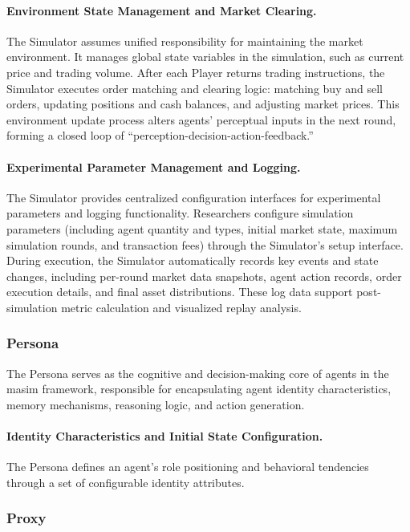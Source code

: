 \documentclass{article}
\begin{document}
\paragraph{Environment State Management and Market Clearing.}
The Simulator assumes unified responsibility for maintaining the market environment. It manages global state variables in the simulation, such as current price and trading volume. After each Player returns trading instructions, the Simulator executes order matching and clearing logic: matching buy and sell orders, updating positions and cash balances, and adjusting market prices. This environment update process alters agents' perceptual inputs in the next round, forming a closed loop of ``perception-decision-action-feedback.''

\paragraph{Experimental Parameter Management and Logging.}
The Simulator provides centralized configuration interfaces for experimental parameters and logging functionality. Researchers configure simulation parameters (including agent quantity and types, initial market state, maximum simulation rounds, and transaction fees) through the Simulator's setup interface. During execution, the Simulator automatically records key events and state changes, including per-round market data snapshots, agent action records, order execution details, and final asset distributions. These log data support post-simulation metric calculation and visualized replay analysis.

\subsubsection{Persona}
\label{subsubsec:persona}

The Persona serves as the cognitive and decision-making core of agents in the masim framework, responsible for encapsulating agent identity characteristics, memory mechanisms, reasoning logic, and action generation.

\paragraph{Identity Characteristics and Initial State Configuration.}
The Persona defines an agent's role positioning and behavioral tendencies through a set of configurable identity attributes.

\subsubsection{Proxy}
\label{subsubsec:proxy}
\end{document}
